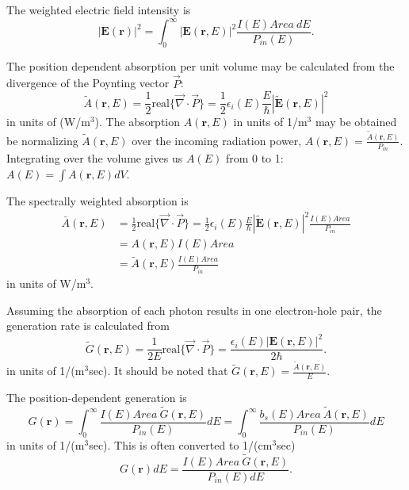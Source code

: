 \documentclass[12pt]{article}
\begin{document}
The weighted electric field intensity is 
\begin{equation}
| \mathbf{E}(\mathbf{r}) |^2 = \int_0^{\infty}  | \mathbf{E}(\mathbf{r}, E) |^2 \frac{I(E) Area~dE}{P_{in}(E)}.
\end{equation}


The position dependent absorption per unit volume may be calculated from the divergence of the Poynting vector $\vec{P}$:
\begin{equation} 
\tilde{A}(\mathbf{r}, E) = \frac{1}{2} \mathrm{real} \{ {\vec{\nabla} \cdot \vec{P}} \} = \frac{1}{2} \epsilon_i(E) \frac{E}{\hbar}  \left| \tilde{\mathbf{E}}(\mathbf{r}, E) \right|^2
\end{equation}
in units of (W/m$^3$).  The absorption $A(\mathbf{r}, E)$ in units of 1/m$^3$ may be obtained be normalizing $\tilde{A}(\mathbf{r}, E)$ over the incoming radiation power, 
$A(\mathbf{r}, E) = \frac{\tilde{A}(\mathbf{r}, E)}{P_{in}}$.  Integrating over the volume gives us $A(E)$ from 0 to 1: $A(E) = \int A(\mathbf{r}, E) dV$.  

The spectrally weighted absorption is
\begin{align} 
\bar{A}(\mathbf{r}, E) &= \frac{1}{2} \mathrm{real} \{ {\vec{\nabla} \cdot \vec{P}} \} = \frac{1}{2} \epsilon_i(E) \frac{E}{\hbar}  \left| \tilde{\mathbf{E}}(\mathbf{r}, E) \right|^2 \frac{I(E) Area}{P_{in}} \\
&= A(\mathbf{r}, E) I(E) Area \\
&= \tilde{A}(\mathbf{r}, E) \frac{I(E) Area}{P_{in}}
\end{align}
in units of W/m$^3$.

Assuming the absorption of each photon results in one electron-hole pair, the generation rate is calculated from  
\begin{equation}
\tilde{G}(\mathbf{r}, E) = \frac{1}{2 E} \mathrm{real} \{ {\vec{\nabla} \cdot \vec{P}} \} 
= \frac{\epsilon_i(E) \left| \mathbf{E}(\mathbf{r}, E) \right|^2}{2 \hbar}.
\end{equation}
in units of 1/(m$^3$sec).
It should be noted that $\tilde{G}(\mathbf{r}, E) = \frac{\tilde{A}(\mathbf{r}, E)}{E}$.  

The position-dependent generation is 
\begin{equation}
G(\mathbf{r}) = \int_{0}^{\infty} \frac{I(E) Area~\tilde{G}(\mathbf{r}, E)}{P_{in}(E) } dE = \int_{0}^{\infty}  \frac{b_s(E) Area~\tilde{A}(\mathbf{r}, E)}{P_{in}(E)} dE
\end{equation}
in units of 1/(m$^3$sec).  This is often converted to 1/(cm$^3$sec)
\begin{equation}
G(\mathbf{r})dE = \frac{ I(E) Area~\tilde{G}(\mathbf{r}, E)}{P_{in}(E) dE}.
\end{equation}
\end{document}
